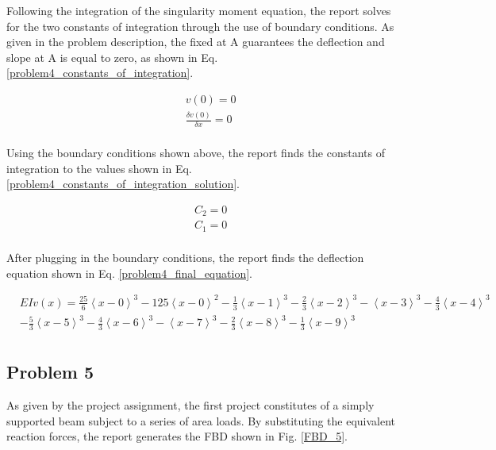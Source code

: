 \documentclass[a4paper]{article}
\begin{document}
Following the integration of the singularity moment equation, the report solves for the two constants of integration through the use of boundary conditions. As given in the problem description, the fixed at A guarantees the deflection and slope at A is equal to zero, as shown in Eq. \ref{problem4_constants_of_integration}.

\begin{equation}
\begin{split}
	& v(0) = 0 \\
	& \frac{\delta v(0)}{\delta x} = 0 \\
\end{split}
\label{problem4_constants_of_integration}
\end{equation}

Using the boundary conditions shown above, the report finds the constants of integration to the values shown in Eq. \ref{problem4_constants_of_integration_solution}.

\begin{equation}
\begin{split}
	& C_2 = 0 \\
	& C_1 = 0 \\
\end{split}
\label{problem4_constants_of_integration_solution}
\end{equation}

After plugging in the boundary conditions, the report finds the deflection equation shown in Eq. \ref{problem4_final_equation}.

\begin{equation}
\begin{split}
  & EI v(x) = \frac{25}{6}\left<x-0\right>^3 - 125\left<x-0\right>^2 - \frac{1}{3}\left<x-1\right>^3 - \frac{2}{3}\left<x-2\right>^3 - \left<x-3\right>^3 - \frac{4}{3}\left<x-4\right>^3\\
& - \frac{5}{3}\left<x-5\right>^3  -  \frac{4}{3}\left<x-6\right>^3 - \left<x-7\right>^3 -  \frac{2}{3}\left<x-8\right>^3 - \frac{1}{3}\left<x-9\right>^3 \\
\end{split}
\label{problem4_final_equation}
\end{equation}



\subsection{Problem 5}

As given by the project assignment, the first project constitutes of a simply supported beam subject to a series of area loads. By substituting the equivalent reaction forces, the report generates the FBD shown in Fig. \ref{FBD_5}.
\end{document}
